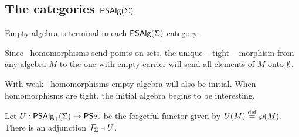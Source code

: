 \documentclass[10pt]{article}
\begin{document}

\subsection{The categories $\mbox{\sf PSAlg}(\Sigma)$}

\begin{Fact}
\label{le:terMAPS}
Empty algebra is terminal in each $\mbox{\sf PSAlg}(\Sigma)$ category.
\end{Fact}

\begin{Proof}
Since \PS\ homomorphisms send points on sets, the unique -- tight --
morphism from any algebra $M$ to the one with empty carrier will send
all elements of $M$ onto $\emptyset$.
\end{Proof}


\noindent
With weak \PS\ homomorphisms empty algebra will also be initial.
When homomorphisms are tight, the initial algebra begins to be interesting.

\begin{Prop}
\label{le:MAPStADJ}
Let $U:\mbox{\sf PSAlg}_{\sf T}(\Sigma)\rightarrow\mbox{\rm\sf PSet}$ be the forgetful functor given by
$U(M)\stackrel{{\rm \tiny{def}}}=\wp(\underline {M})$.  There is an adjunction ${\cal T}_{\Sigma}\mathrel{\scriptstyle\dashv} U$.
\end{Prop}
\end{document}
